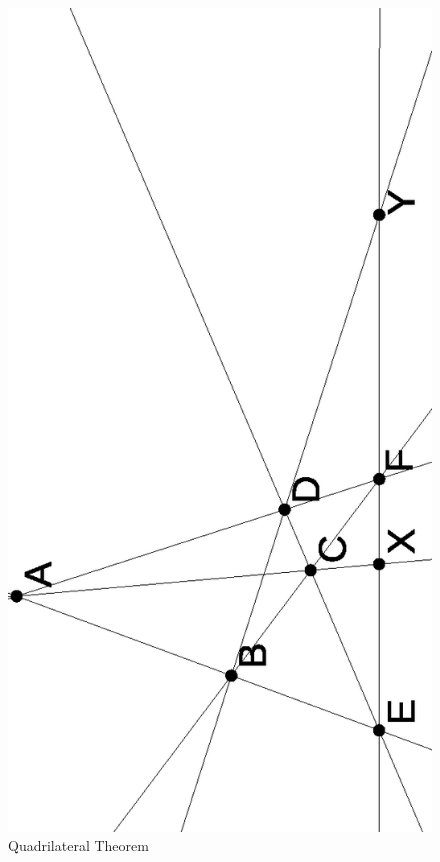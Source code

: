 \documentclass[letterpaper,11pt]{article}
\theoremstyle{definition}
\theoremstyle{remark}
\begin{document}
\begin{figure}[!htb]
\centering
\includegraphics[scale=0.7,angle=270]{quad.eps}
\caption{Quadrilateral Theorem}
\end{figure}
\end{document}
